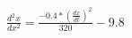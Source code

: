 \documentclass[10pt]{article}
\begin{document}
$\frac{d^{2}x}{dx^{2}}=\frac{-0.4*(\frac{dx}{dt})^{2}}{320}-9.8$
\end{document}
